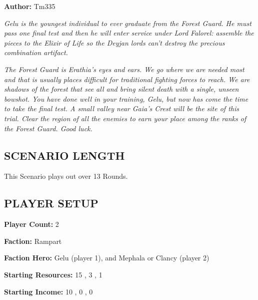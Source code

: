 \cleardoublepage{}

\begin{multicols*}{2}

\textbf{Author:} Tm335


\textit{Gelu is the youngest individual to ever graduate from the Forest Guard.
  He must pass one final test and then he will enter service under Lord Falorel: assemble the pieces to the Elixir of Life so the Deyjan lords can't destroy the precious combination artifact.
}

\textit{The Forest Guard is Erathia’s eyes and ears.
  We go where we are needed most and that is usually places difficult for traditional fighting forces to reach.
  We are shadows of the forest that see all and bring silent death with a single, unseen bowshot.
  You have done well in your training, Gelu, but now has come the time to take the final test.
  A small valley near Gaia's Crest will be the site of this trial.
  Clear the region of all the enemies to earn your place among the ranks of the Forest Guard.
  Good luck.
}

\subsection*{\MakeUppercase{Scenario Length}}

This Scenario plays out over 13 Rounds.

\subsection*{\MakeUppercase{Player Setup}}

\textbf{Player Count:} 2

\textbf{Faction:} Rampart

\textbf{Faction Hero:} Gelu (player 1), and Mephala or Clancy (player 2)

\textbf{Starting Resources:} 15 , 3 , 1 

\textbf{Starting Income:} 10 , 0 , 0 


\end{multicols*}
